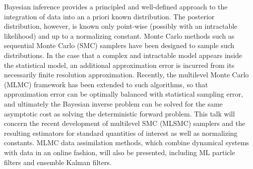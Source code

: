 Bayesian inference provides a principled and well-defined approach
to the integration of data into an a priori known distribution. The
posterior distribution, however, is known only point-wise (possibly
with an intractable likelihood) and up to a normalizing constant.
Monte Carlo methods such as sequential Monte Carlo (SMC) samplers
have been designed to sample such distributions. In the case that a
complex and intractable model appears inside the statistical model,
an additional approximation error is incurred from its necessarily
finite resolution approximation. Recently, the multilevel Monte Carlo
(MLMC) framework has been extended to such algorithms, so that
approximation error can be optimally balanced with statistical
sampling error, and ultimately the Bayesian inverse problem can be
solved for the same asymptotic cost as solving the deterministic
forward problem. This talk will concern the recent development of
multilevel SMC (MLSMC) samplers and the resulting estimators for
standard quantities of interest as well as normalizing constants.
MLMC data assimilation methods, which combine dynamical systems
with data in an online fashion, will also be presented, including ML
particle filters and ensemble Kalman filters.